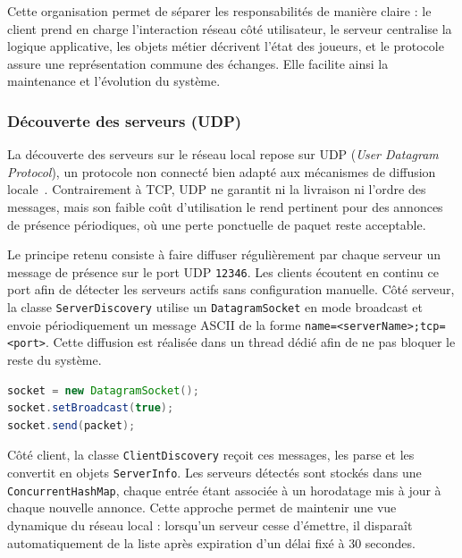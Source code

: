 \documentclass[a4paper]{article}
\begin{document}
Cette organisation permet de séparer les responsabilités de manière claire : le client prend en charge l’interaction réseau côté utilisateur, le serveur centralise la logique applicative, les objets métier décrivent l’état des joueurs, et le protocole assure une représentation commune des échanges. Elle facilite ainsi la maintenance et l’évolution du système.

\subsubsection{Découverte des serveurs (UDP)}

La découverte des serveurs sur le réseau local repose sur UDP (\textit{User Datagram Protocol}), un protocole non connecté bien adapté aux mécanismes de diffusion locale~\cite{udp_protocol}. Contrairement à TCP, UDP ne garantit ni la livraison ni l’ordre des messages, mais son faible coût d’utilisation le rend pertinent pour des annonces de présence périodiques, où une perte ponctuelle de paquet reste acceptable.

Le principe retenu consiste à faire diffuser régulièrement par chaque serveur un message de présence sur le port UDP \texttt{12346}. Les clients écoutent en continu ce port afin de détecter les serveurs actifs sans configuration manuelle. Côté serveur, la classe \texttt{ServerDiscovery} utilise un \texttt{DatagramSocket} en mode broadcast et envoie périodiquement un message ASCII de la forme \texttt{name=<serverName>;tcp=<port>}. Cette diffusion est réalisée dans un thread dédié afin de ne pas bloquer le reste du système.

\begin{center}
\begin{minipage}{0.35\textwidth}
\begin{lstlisting}[language=Java, caption={Envoi d'un message UDP}]
socket = new DatagramSocket();
socket.setBroadcast(true);
socket.send(packet);
\end{lstlisting}
\end{minipage}
\end{center}

Côté client, la classe \texttt{ClientDiscovery} reçoit ces messages, les parse et les convertit en objets \texttt{ServerInfo}. Les serveurs détectés sont stockés dans une \texttt{ConcurrentHashMap}, chaque entrée étant associée à un horodatage mis à jour à chaque nouvelle annonce. Cette approche permet de maintenir une vue dynamique du réseau local : lorsqu’un serveur cesse d’émettre, il disparaît automatiquement de la liste après expiration d’un délai fixé à 30 secondes.
\end{document}
